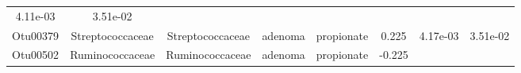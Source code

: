 \documentclass[11pt,]{article}
\begin{document}
\begin{longtable}[]{@{}cccccccc@{}}
\begin{minipage}[t]{0.08\columnwidth}
4.11e-03\strut
\end{minipage} & \begin{minipage}[t]{0.08\columnwidth}\centering\strut
3.51e-02\strut
\end{minipage}\tabularnewline
\begin{minipage}[t]{0.08\columnwidth}\centering\strut
Otu00379\strut
\end{minipage} & \begin{minipage}[t]{0.15\columnwidth}\centering\strut
Streptococcaceae\strut
\end{minipage} & \begin{minipage}[t]{0.15\columnwidth}\centering\strut
Streptococcaceae\strut
\end{minipage} & \begin{minipage}[t]{0.08\columnwidth}\centering\strut
adenoma\strut
\end{minipage} & \begin{minipage}[t]{0.09\columnwidth}\centering\strut
propionate\strut
\end{minipage} & \begin{minipage}[t]{0.07\columnwidth}\centering\strut
0.225\strut
\end{minipage} & \begin{minipage}[t]{0.08\columnwidth}\centering\strut
4.17e-03\strut
\end{minipage} & \begin{minipage}[t]{0.08\columnwidth}\centering\strut
3.51e-02\strut
\end{minipage}\tabularnewline
\begin{minipage}[t]{0.08\columnwidth}\centering\strut
Otu00502\strut
\end{minipage} & \begin{minipage}[t]{0.15\columnwidth}\centering\strut
Ruminococcaceae\strut
\end{minipage} & \begin{minipage}[t]{0.15\columnwidth}\centering\strut
Ruminococcaceae\strut
\end{minipage} & \begin{minipage}[t]{0.08\columnwidth}\centering\strut
adenoma\strut
\end{minipage} & \begin{minipage}[t]{0.09\columnwidth}\centering\strut
propionate\strut
\end{minipage} & \begin{minipage}[t]{0.07\columnwidth}\centering\strut
-0.225\strut
\end{minipage} & \begin{minipage}[t]{0.08\columnwidth}\centering\strut

\end{minipage}
\end{longtable}
\end{document}
